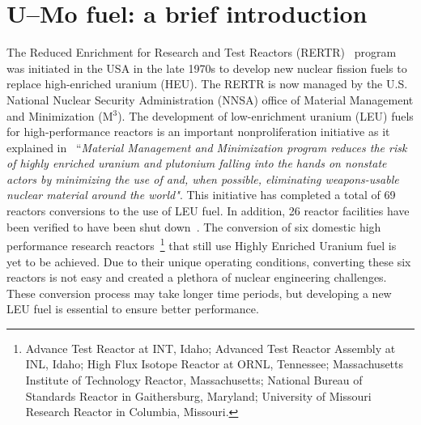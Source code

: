 \chapter{U--Mo fuel: a brief introduction}

The Reduced Enrichment for Research and Test Reactors (RERTR)~\cite{snelgrove1997development} program was initiated in the USA in the late 1970s to develop new nuclear fission fuels to replace high-enriched uranium (HEU)\@. The RERTR is now managed by the U.S. National Nuclear Security Administration (NNSA) office of Material Management and Minimization (M$^3$). The development of low-enrichment uranium (LEU) fuels for high-performance reactors is an important nonproliferation initiative as it explained in~\cite{m3web} ``\textit{Material Management and Minimization program reduces the risk of highly enriched uranium and plutonium falling into the hands on nonstate actors by minimizing the use of and, when possible, eliminating weapons-usable nuclear material around the world"}. This initiative has completed a total of 69 reactors conversions to the use of LEU fuel. In addition, 26 reactor facilities have been verified to have been shut down~\cite{wilson2017us}. The conversion of six domestic high performance research reactors~\footnote{Advance Test Reactor at INT, Idaho; Advanced Test Reactor Assembly at INL, Idaho; High Flux Isotope Reactor at ORNL, Tennessee; Massachusetts Institute of Technology Reactor, Massachusetts; National Bureau of Standards Reactor in Gaithersburg, Maryland; University of Missouri Research Reactor in Columbia, Missouri.} that still use Highly Enriched Uranium fuel is yet to be achieved. Due to their unique operating conditions, converting these six reactors is not easy and created a plethora of nuclear engineering challenges. These conversion process may take longer time periods, but developing a new LEU fuel is essential to ensure better performance. 



